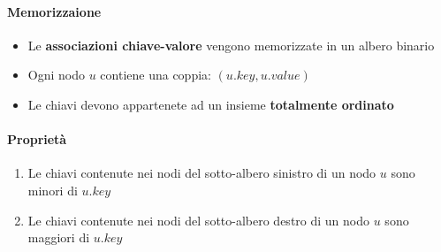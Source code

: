     \paragraph{Memorizzaione}\begin{itemize}
        \item Le \textbf{associazioni chiave-valore} vengono memorizzate in un albero binario
        \item Ogni nodo $ u $ contiene una coppia: $ (u.key, u.value) $
        \item Le chiavi devono appartenete ad un insieme \textbf{totalmente ordinato}
    \end{itemize}
    \paragraph{Proprietà}
    \begin{enumerate}
        \item Le chiavi contenute nei nodi del sotto-albero sinistro di un nodo $ u $ sono minori di $ u.key $
        \item Le chiavi contenute nei nodi del sotto-albero destro di un nodo $ u $ sono maggiori di $ u.key $
    \end{enumerate}
